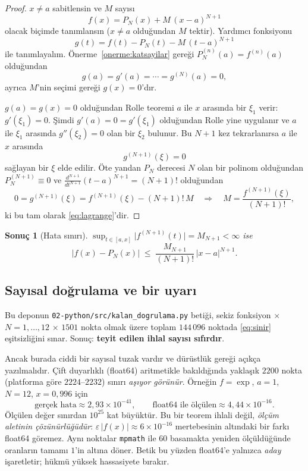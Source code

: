\documentclass[11pt,a4paper]{article}
\theoremstyle{plain}
\newtheorem{sonuc}[teorem]{Sonuç}
\theoremstyle{definition}
\theoremstyle{remark}
\begin{document}
\begin{proof}
$x \neq a$ sabitlensin ve $M$ sayısı
\[
  f(x) = P_N(x) + M\,(x-a)^{N+1}
\]
olacak biçimde tanımlansın ($x \ne a$ olduğundan $M$ tektir). Yardımcı
fonksiyonu
\[
  g(t) = f(t) - P_N(t) - M\,(t-a)^{N+1}
\]
ile tanımlayalım. Önerme~\ref{onerme:katsayilar} gereği $P_N^{(n)}(a) =
f^{(n)}(a)$ olduğundan
\[
  g(a) = g'(a) = \cdots = g^{(N)}(a) = 0,
\]
ayrıca $M$'nin seçimi gereği $g(x) = 0$'dır.

$g(a) = g(x) = 0$ olduğundan Rolle teoremi $a$ ile $x$ arasında bir $\xi_1$
verir: $g'(\xi_1) = 0$. Şimdi $g'(a) = 0 = g'(\xi_1)$ olduğundan Rolle yine
uygulanır ve $a$ ile $\xi_1$ arasında $g''(\xi_2) = 0$ olan bir $\xi_2$
bulunur. Bu $N+1$ kez tekrarlanırsa $a$ ile $x$ arasında
\[
  g^{(N+1)}(\xi) = 0
\]
sağlayan bir $\xi$ elde edilir. Öte yandan $P_N$ derecesi $N$ olan bir polinom
olduğundan $P_N^{(N+1)} \equiv 0$ ve $\frac{d^{N+1}}{dt^{N+1}}(t-a)^{N+1} =
(N+1)!$ olduğundan
\[
  0 = g^{(N+1)}(\xi) = f^{(N+1)}(\xi) - (N+1)!\,M
  \quad\Longrightarrow\quad
  M = \frac{f^{(N+1)}(\xi)}{(N+1)!},
\]
ki bu tam olarak \eqref{eq:lagrange}'dir.
\end{proof}

\begin{sonuc}[Hata sınırı]\label{sonuc:sinir}
$\displaystyle\sup_{t \in [a,x]} \bigl|f^{(N+1)}(t)\bigr| = M_{N+1} < \infty$ ise
\begin{equation}\label{eq:sinir}
  \bigl|f(x) - P_N(x)\bigr| \;\le\; \frac{M_{N+1}}{(N+1)!}\,|x-a|^{N+1}.
\end{equation}
\end{sonuc}

\subsection*{Sayısal doğrulama ve bir uyarı}

Bu deponun \texttt{02-python/src/kalan\_dogrulama.py} betiği, sekiz fonksiyon
$\times$ $N=1,\dots,12$ $\times$ $1501$ nokta olmak üzere toplam $144\,096$
noktada \eqref{eq:sinir} eşitsizliğini sınar. Sonuç: \textbf{teyit edilen ihlal
sayısı sıfırdır}.

Ancak burada ciddi bir sayısal tuzak vardır ve dürüstlük gereği açıkça
yazılmalıdır. Çift duyarlıklı (float64) aritmetikle bakıldığında
yaklaşık $2200$ nokta (platforma göre $2224$--$2232$) sınırı \emph{aşıyor görünür}. Örneğin $f=\exp$, $a=1$, $N=12$,
$x=0{,}996$ için
\[
  \text{gerçek hata} \approx 2{,}93\times 10^{-41},
  \qquad
  \text{float64 ile ölçülen} \approx 4{,}44\times 10^{-16}.
\]
Ölçülen değer sınırdan $10^{25}$ kat büyüktür. Bu bir teorem ihlali değil,
\emph{ölçüm aletinin çözünürlüğüdür}: $\varepsilon\,|f(x)| \approx 6\times
10^{-16}$ mertebesinin altındaki bir farkı float64 göremez. Aynı noktalar
\texttt{mpmath} ile $60$ basamakta yeniden ölçüldüğünde oranların tamamı $1$'in
altına döner. Betik bu yüzden float64'e yalnızca \emph{aday} işaretletir;
hükmü yüksek hassasiyete bırakır.
\end{document}
